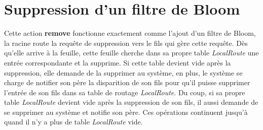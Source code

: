 \documentclass[a4paper,11pt]{report}
\begin{document}
\section{Suppression d'un filtre de Bloom}
	Cette action \textbf{remove} fonctionne exactement comme l'ajout d'un filtre de Bloom, la racine route la requête de suppression vers le fils qui gère cette requête. Dès qu'elle arrive à la feuille, cette feuille cherche dans sa propre table \textit{LocalRoute} une entrée correspondante et la supprime. Si cette table devient vide après la suppression, elle demande de la supprimer au système, en plus, le système se charge de notifier son père la disparition de son fils pour qu'il puisse supprimer l'entrée de son fils dans sa table de routage \textit{LocalRoute}. Du coup, si sa propre table \textit{LocalRoute} devient vide après la suppression de son fils, il aussi demande de se supprimer au système et notifie son père. Ces opérations continuent jusqu'à quand il n'y a plus de table \textit{LocalRoute} vide.
\end{document}
